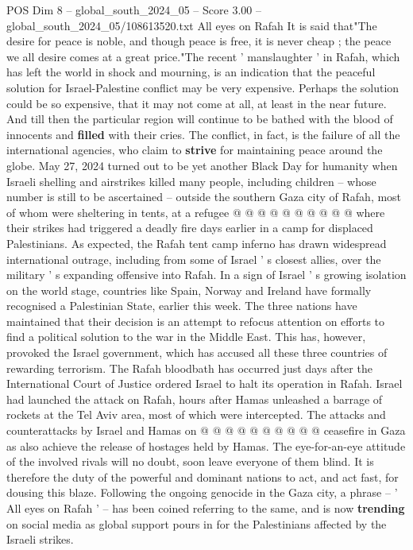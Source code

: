 \begin{textsample}{POS Dim 8 – global\_south\_2024\_05 – Score 3.00 – global\_south\_2024\_05/108613520.txt}  \label{ex:f8_pos_349}
All eyes on Rafah It is said that"The desire for peace is noble, and though peace is free, it is never cheap ; the peace we all desire comes at a great price."The recent ' manslaughter ' in Rafah, which has left the world in shock and mourning, is an indication that the peaceful solution for Israel-Palestine conflict may be very expensive.
Perhaps the solution could be so expensive, that it may not come at all, at least in the near future.
And till then the particular region will continue to be bathed with the blood of innocents and \textbf{filled} with their cries.
The conflict, in fact, is the failure of all the international agencies, who claim to \textbf{strive} for maintaining peace around the globe.
May 27, 2024 turned out to be yet another Black Day for humanity when Israeli shelling and airstrikes killed many people, including children -- whose number is still to be ascertained -- outside the southern Gaza city of Rafah, most of whom were sheltering in tents, at a refugee @ @ @ @ @ @ @ @ @ @ where their strikes had triggered a deadly fire days earlier in a camp for displaced Palestinians.
As expected, the Rafah tent camp inferno has drawn widespread international outrage, including from some of Israel ' s closest allies, over the military ' s expanding offensive into Rafah.
In a sign of Israel ' s growing isolation on the world stage, countries like Spain, Norway and Ireland have formally recognised a Palestinian State, earlier this week.
The three nations have maintained that their decision is an attempt to refocus attention on efforts to find a political solution to the war in the Middle East.
This has, however, provoked the Israel government, which has accused all these three countries of rewarding terrorism.
The Rafah bloodbath has occurred just days after the International Court of Justice ordered Israel to halt its operation in Rafah.
Israel had launched the attack on Rafah, hours after Hamas unleashed a barrage of rockets at the Tel Aviv area, most of which were intercepted.
The attacks and counterattacks by Israel and Hamas on @ @ @ @ @ @ @ @ @ @ ceasefire in Gaza as also achieve the release of hostages held by Hamas.
The eye-for-an-eye attitude of the involved rivals will no doubt, soon leave everyone of them blind.
It is therefore the duty of the powerful and dominant nations to act, and act fast, for dousing this blaze.
Following the ongoing genocide in the Gaza city, a phrase -- ' All eyes on Rafah ' -- has been coined referring to the same, and is now \textbf{trending} on social media as global support pours in for the Palestinians affected by the Israeli strikes.

\end{textsample}
